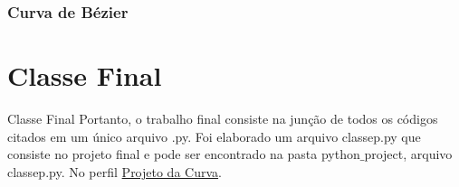 \documentclass[10pt]{beamer}
\theoremstyle{definition}
\begin{document}
\subsubsection{Curva de Bézier}
\begin{frame}
\end{frame}

\section{Classe Final}
\begin{frame}{Classe Final}
    Portanto, o trabalho final consiste na junção de todos os códigos citados em um único arquivo .py. Foi elaborado um arquivo classep.py que consiste no projeto final e pode ser encontrado na pasta  python$\_$project, arquivo classep.py. No perfil \hyperlink{https://github.com/oziieljuniior/GM}{Projeto da Curva}.
\end{frame}
\end{document}
